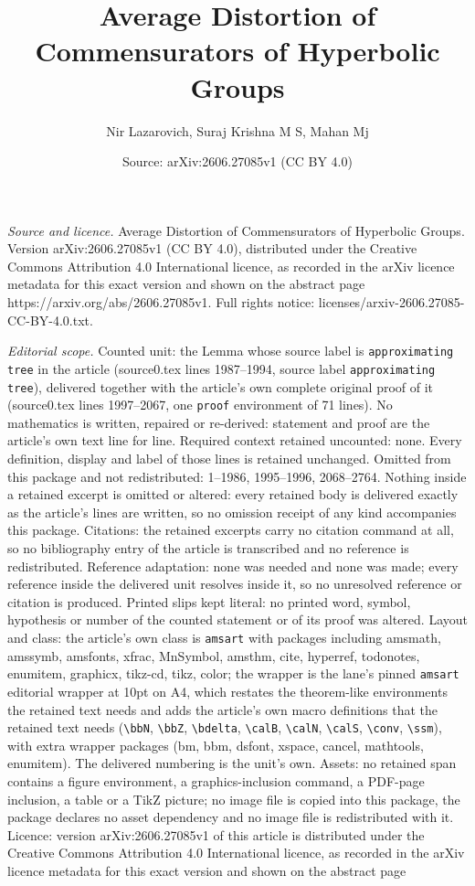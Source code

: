 \documentclass[10pt,a4paper]{amsart}
\title[Average Distortion of Commensurators of Hyperbolic Groups]{Average Distortion of Commensurators of Hyperbolic Groups}
\author{Nir Lazarovich, Suraj Krishna M S, Mahan Mj}
\date{Source: arXiv:2606.27085v1 (CC BY 4.0)}
\begin{document}
\maketitle

\noindent\emph{Source and licence.} Average Distortion of Commensurators of Hyperbolic Groups. Version arXiv:2606.27085v1 (CC BY 4.0), distributed under the Creative Commons Attribution 4.0 International licence, as recorded in the arXiv licence metadata for this exact version and shown on the abstract page https://arxiv.org/abs/2606.27085v1. Full rights notice: licenses/arxiv-2606.27085-CC-BY-4.0.txt.\par\smallskip

\noindent\textit{Editorial scope.} Counted unit: the Lemma whose source label is \texttt{approximating tree} in the article (source0.tex lines 1987--1994, source label \texttt{approximating tree}), delivered together with the article's own complete original proof of it (source0.tex lines 1997--2067, one \texttt{proof} environment of 71 lines). No mathematics is written, repaired or re-derived: statement and proof are the article's own text line for line. Required context retained uncounted: none. Every definition, display and label of those lines is retained unchanged. Omitted from this package and not redistributed: 1--1986, 1995--1996, 2068--2764. Nothing inside a retained excerpt is omitted or altered: every retained body is delivered exactly as the article's lines are written, so no omission receipt of any kind accompanies this package. Citations: the retained excerpts carry no citation command at all, so no bibliography entry of the article is transcribed and no reference is redistributed. Reference adaptation: none was needed and none was made; every reference inside the delivered unit resolves inside it, so no unresolved reference or citation is produced. Printed slips kept literal: no printed word, symbol, hypothesis or number of the counted statement or of its proof was altered. Layout and class: the article's own class is \texttt{amsart} with packages including amsmath, amssymb, amsfonts, xfrac, MnSymbol, amsthm, cite, hyperref, todonotes, enumitem, graphicx, tikz-cd, tikz, color; the wrapper is the lane's pinned \texttt{amsart} editorial wrapper at 10pt on A4, which restates the theorem-like environments the retained text needs and adds the article's own macro definitions that the retained text needs (\texttt{\textbackslash bbN}, \texttt{\textbackslash bbZ}, \texttt{\textbackslash bdelta}, \texttt{\textbackslash calB}, \texttt{\textbackslash calN}, \texttt{\textbackslash calS}, \texttt{\textbackslash conv}, \texttt{\textbackslash ssm}), with extra wrapper packages (bm, bbm, dsfont, xspace, cancel, mathtools, enumitem). The delivered numbering is the unit's own. Assets: no retained span contains a figure environment, a graphics-inclusion command, a PDF-page inclusion, a table or a TikZ picture; no image file is copied into this package, the package declares no asset dependency and no image file is redistributed with it. Licence: version arXiv:2606.27085v1 of this article is distributed under the Creative Commons Attribution 4.0 International licence, as recorded in the arXiv licence metadata for this exact version and shown on the abstract page 
\end{document}
